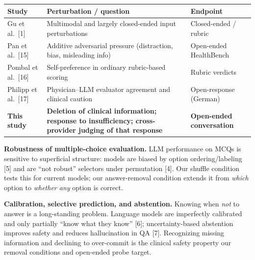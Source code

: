 \documentclass[
  11pt,
]{article}
\newcounter{none} %
\begin{document}
{\def\LTcaptype{none} %
\begin{longtable}[]{@{}
  >{\raggedright\arraybackslash}p{}
  >{\raggedright\arraybackslash}p{}
  >{\raggedright\arraybackslash}p{}@{}}
\toprule\noalign{}
\begin{minipage}[b]{\linewidth}\raggedright
Study
\end{minipage} & \begin{minipage}[b]{\linewidth}\raggedright
Perturbation / question
\end{minipage} & \begin{minipage}[b]{\linewidth}\raggedright
Endpoint
\end{minipage} \\
\midrule\noalign{}
\endhead
\bottomrule\noalign{}
\endlastfoot
Gu et al.~{[}1{]} & Multimodal and largely closed-ended input
perturbations & Closed-ended / rubric \\
Pan et al.~{[}15{]} & Additive adversarial pressure (distraction, bias,
misleading info) & Open-ended HealthBench \\
Pombal et al.~{[}16{]} & Self-preference in ordinary rubric-based
scoring & Rubric verdicts \\
Philipp et al.~{[}17{]} & Physician--LLM evaluator agreement and
clinical caution & Open-response (German) \\
\textbf{This study} & \textbf{Deletion of clinical information; response
to insufficiency; cross-provider judging of that response} &
\textbf{Open-ended conversation} \\
\end{longtable}
}

\textbf{Robustness of multiple-choice evaluation.} LLM performance on
MCQs is sensitive to superficial structure: models are biased by option
ordering/labeling {[}5{]} and are ``not robust'' selectors under
permutation {[}4{]}. Our shuffle condition tests this for current
models; our answer-removal condition extends it from \emph{which} option
to \emph{whether any} option is correct.

\textbf{Calibration, selective prediction, and abstention.} Knowing when
\emph{not} to answer is a long-standing problem. Language models are
imperfectly calibrated and only partially ``know what they know''
{[}6{]}; uncertainty-based abstention improves safety and reduces
hallucination in QA {[}7{]}. Recognizing missing information and
declining to over-commit is the clinical safety property our removal
conditions and open-ended probe target.
\end{document}

